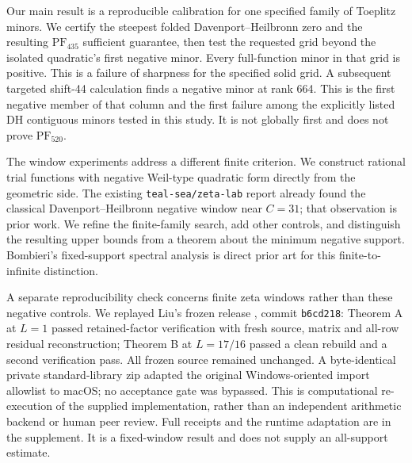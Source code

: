 \documentclass[11pt]{article}
\theoremstyle{remark}
\newcommand{\PF}{\mathrm{PF}}
\newcommand{\code}[1]{\nolinkurl{#1}}
\begin{document}
Our main result is a reproducible calibration for one specified family of
Toeplitz minors. We certify the steepest folded Davenport--Heilbronn zero and
the resulting \(\PF_{435}\) sufficient guarantee, then test the requested
grid beyond the isolated quadratic's first negative minor. Every full-function minor in that grid is positive. This is a failure of sharpness for the
specified solid grid. A subsequent targeted shift-44 calculation finds a
negative minor at rank 664. This is the first negative member of that column and the first failure
among the explicitly listed DH contiguous minors tested in this study.
It is not globally first and does not prove \(\PF_{520}\).

The window experiments address a different finite criterion. We construct
rational trial functions with negative Weil-type quadratic form directly
from the geometric side. The existing \texttt{teal-sea/zeta-lab} report
\cite{teal2026} already found the classical Davenport--Heilbronn negative
window near \(C=31\); that observation is prior work. We refine the
finite-family search, add other controls, and distinguish the resulting
upper bounds from a theorem about the minimum negative support.
Bombieri's fixed-support spectral analysis \cite{bombieri2000} is direct
prior art for this finite-to-infinite distinction.

A separate reproducibility check concerns finite zeta windows rather than
these negative controls. We replayed Liu's frozen release
\cite{liuFrozen2026}, commit \code{b6cd218}: Theorem A at \(L=1\)
passed retained-factor verification with fresh source, matrix and all-row
residual reconstruction; Theorem B at \(L=17/16\) passed a clean rebuild
and a second verification pass. All frozen source remained unchanged.
A byte-identical private standard-library zip adapted the original
Windows-oriented import allowlist to macOS; no acceptance gate was bypassed.
This is computational re-execution of the supplied implementation, rather
than an independent arithmetic backend or human peer review. Full receipts
and the runtime adaptation are in the supplement. It is a fixed-window
result and does not supply an all-support estimate.
\end{document}
